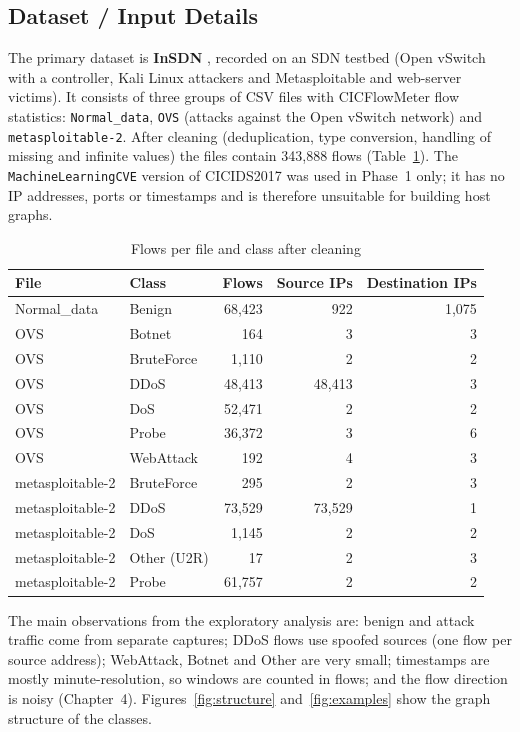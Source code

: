 \begin{appendices}
\section{Dataset / Input Details}
The primary dataset is \textbf{InSDN} \cite{bib:insdn}, recorded on an SDN testbed (Open vSwitch with a controller, Kali Linux attackers and Metasploitable and web-server victims). It consists of three groups of CSV files with CICFlowMeter flow statistics: \texttt{Normal\_data}, \texttt{OVS} (attacks against the Open vSwitch network) and \texttt{metasploitable-2}. After cleaning (deduplication, type conversion, handling of missing and infinite values) the files contain 343,888 flows (Table~\ref{tab:dataset}). The \texttt{MachineLearningCVE} version of CICIDS2017 \cite{bib:cicids} was used in Phase~1 only; it has no IP addresses, ports or timestamps and is therefore unsuitable for building host graphs.

\begin{table}[htbp]
\centering
\caption{Flows per file and class after cleaning}
\label{tab:dataset}
\small
\begin{tabular}{|l|l|r|r|r|}
\hline
\textbf{File} & \textbf{Class} & \textbf{Flows} & \textbf{Source IPs} & \textbf{Destination IPs} \\ \hline
Normal\_data & Benign & 68,423 & 922 & 1,075 \\ \hline
OVS & Botnet & 164 & 3 & 3 \\ \hline
OVS & BruteForce & 1,110 & 2 & 2 \\ \hline
OVS & DDoS & 48,413 & 48,413 & 3 \\ \hline
OVS & DoS & 52,471 & 2 & 2 \\ \hline
OVS & Probe & 36,372 & 3 & 6 \\ \hline
OVS & WebAttack & 192 & 4 & 3 \\ \hline
metasploitable-2 & BruteForce & 295 & 2 & 3 \\ \hline
metasploitable-2 & DDoS & 73,529 & 73,529 & 1 \\ \hline
metasploitable-2 & DoS & 1,145 & 2 & 2 \\ \hline
metasploitable-2 & Other (U2R) & 17 & 2 & 3 \\ \hline
metasploitable-2 & Probe & 61,757 & 2 & 2 \\ \hline
\end{tabular}
\end{table}

The main observations from the exploratory analysis are: benign and attack traffic come from separate captures; DDoS flows use spoofed sources (one flow per source address); WebAttack, Botnet and Other are very small; timestamps are mostly minute-resolution, so windows are counted in flows; and the flow direction is noisy (Chapter~4). Figures~\ref{fig:structure} and~\ref{fig:examples} show the graph structure of the classes.


\end{appendices}
